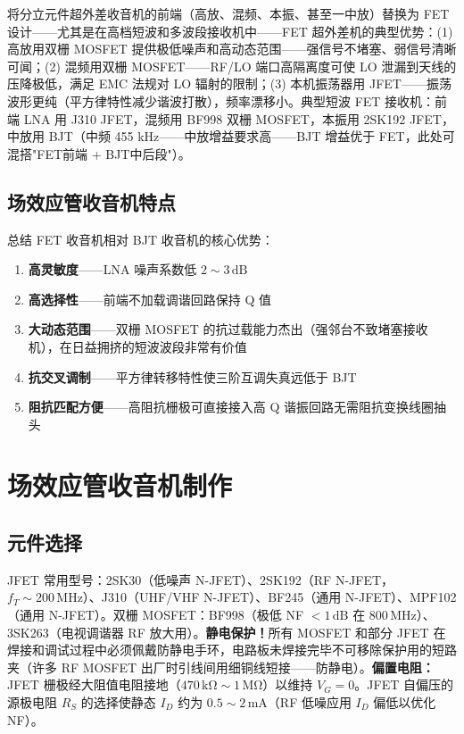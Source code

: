 \documentclass[12pt,UTF8]{ctexbook}
\begin{document}
将分立元件超外差收音机的前端（高放、混频、本振、甚至一中放）替换为 FET 设计——尤其是在高档短波和多波段接收机中——FET 超外差机的典型优势：(1) 高放用双栅 MOSFET 提供极低噪声和高动态范围——强信号不堵塞、弱信号清晰可闻；(2) 混频用双栅 MOSFET——RF/LO 端口高隔离度可使 LO 泄漏到天线的压降极低，满足 EMC 法规对 LO 辐射的限制；(3) 本机振荡器用 JFET——振荡波形更纯（平方律特性减少谐波打散），频率漂移小。典型短波 FET 接收机：前端 LNA 用 J310 JFET，混频用 BF998 双栅 MOSFET，本振用 2SK192 JFET，中放用 BJT（中频 455 kHz——中放增益要求高——BJT 增益优于 FET，此处可混搭"FET前端 + BJT中后段"）。

\subsection{场效应管收音机特点}

总结 FET 收音机相对 BJT 收音机的核心优势：
\begin{enumerate}
\item \textbf{高灵敏度}——LNA 噪声系数低 $2\sim3\,\mathrm{dB}$
\item \textbf{高选择性}——前端不加载调谐回路保持 Q 值
\item \textbf{大动态范围}——双栅 MOSFET 的抗过载能力杰出（强邻台不致堵塞接收机），在日益拥挤的短波波段非常有价值
\item \textbf{抗交叉调制}——平方律转移特性使三阶互调失真远低于 BJT
\item \textbf{阻抗匹配方便}——高阻抗栅极可直接接入高 Q 谐振回路无需阻抗变换线圈抽头
\end{enumerate}

\section{场效应管收音机制作}
\label{sec:fet_radio_building}

\subsection{元件选择}

JFET 常用型号：2SK30（低噪声 N-JFET）、2SK192（RF N-JFET，$f_T\sim200\,\mathrm{MHz}$）、J310（UHF/VHF N-JFET）、BF245（通用 N-JFET）、MPF102（通用 N-JFET）。双栅 MOSFET：BF998（极低 NF $<1\,\mathrm{dB}$ 在 $800\,\mathrm{MHz}$）、3SK263（电视调谐器 RF 放大用）。\textbf{静电保护！}所有 MOSFET 和部分 JFET 在焊接和调试过程中必须佩戴防静电手环，电路板未焊接完毕不可移除保护用的短路夹（许多 RF MOSFET 出厂时引线间用细铜线短接——防静电）。\textbf{偏置电阻：}JFET 栅极经大阻值电阻接地（$470\,\mathrm{k\Omega}\sim1\,\mathrm{M\Omega}$）以维持 $V_G=0$。JFET 自偏压的源极电阻 $R_S$ 的选择使静态 $I_D$ 约为 $0.5\sim2\,\mathrm{mA}$（RF 低噪应用 $I_D$ 偏低以优化 NF）。
\end{document}
